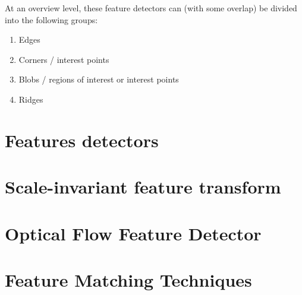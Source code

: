 At an overview level, these feature detectors can (with some overlap) be divided into the following groups:
\begin{enumerate}
	\item Edges
	\item Corners / interest points
	\item Blobs / regions of interest or interest points
	\item Ridges
\end{enumerate}

\section{Features detectors}
\section{Scale-invariant feature transform}
\section{Optical Flow Feature Detector}
\section{Feature Matching Techniques}
